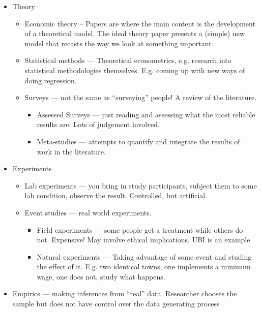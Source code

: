 \documentclass[11pt]{article}
\begin{document}
\begin{itemize}
    \item Theory 
        \begin{itemize}
            \item Economic theory -- Papers are where the main content is the development of a theoretical model. The ideal theory paper presents a (simple) new model that recasts the way we look at something important.
            \item Statistical methods --- Theoretical econometrics, e.g. research into statistical methodologies themselves. E.g. coming up with new ways of doing regression. 
            \item Surveys --- not the same as ``surveying'' people! A review of the literature.
                \begin{itemize}
                    \item Assessed Surveys --- just reading and assessing what the most reliable results are. Lots of judgement involved.
                    \item Meta-studies --- attempts to quantify and integrate the results of work in the literature.
                \end{itemize}
        \end{itemize}
    \item Experiments
        \begin{itemize}
            \item Lab experiments --- you bring in study participants, subject them to some lab condition, observe the result. Controlled, but artificial.
            \item Event studies --- real world experiments. 
                \begin{itemize}
                    \item Field experiments --- some people get a treatment while others do not. Expensive! May involve ethical implications. UBI is an example
                    \item Natural experiments --- Taking advantage of some event and studing the effect of it. E.g. two identical towns, one implements a minimum wage, one does not, study what happens.
                \end{itemize}
        \end{itemize}
    \item Empirics --- making inferences from ``real'' data. Researcher chooses the sample but does not have control over the data generating process
        \begin{itemize}

\end{itemize}
\end{itemize}
\end{document}
